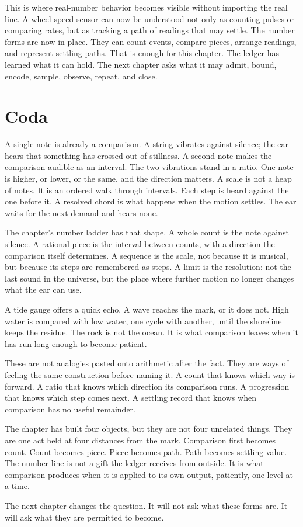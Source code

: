This is where real-number behavior becomes visible without importing the real
line. A wheel-speed sensor can now be understood not only as counting pulses
or comparing rates, but as tracking a path of readings that may settle. The
number forms are now in place. They can count events, compare pieces, arrange
readings, and represent settling paths. That is enough for this chapter. The
ledger has learned what it can hold. The next chapter asks what it may admit,
bound, encode, sample, observe, repeat, and close.


\section*{Coda}

A single note is already a comparison. A string vibrates against silence; the
ear hears that something has crossed out of stillness. A second note makes the
comparison audible as an interval. The two vibrations stand in a ratio. One
note is higher, or lower, or the same, and the direction matters. A scale is
not a heap of notes. It is an ordered walk through intervals. Each step is
heard against the one before it. A resolved chord is what happens when the
motion settles. The ear waits for the next demand and hears none.

The chapter's number ladder has that shape. A whole count is the note against
silence. A rational piece is the interval between counts, with a direction the
comparison itself determines. A sequence is the scale, not because it is
musical, but because its steps are remembered as steps. A limit is the
resolution: not the last sound in the universe, but the place where further
motion no longer changes what the ear can use.

A tide gauge offers a quick echo. A wave reaches the mark, or it does not.
High water is compared with low water, one cycle with another, until the
shoreline keeps the residue. The rock is not the ocean. It is what comparison
leaves when it has run long enough to become patient.

These are not analogies pasted onto arithmetic after the fact. They are ways
of feeling the same construction before naming it. A count that knows which
way is forward. A ratio that knows which direction its comparison runs. A
progression that knows which step comes next. A settling record that knows
when comparison has no useful remainder.

The chapter has built four objects, but they are not four unrelated things.
They are one act held at four distances from the mark. Comparison first
becomes count. Count becomes piece. Piece becomes path. Path becomes settling
value. The number line is not a gift the ledger receives from outside. It is
what comparison produces when it is applied to its own output, patiently, one
level at a time.

The next chapter changes the question. It will not ask what these forms are.
It will ask what they are permitted to become.
